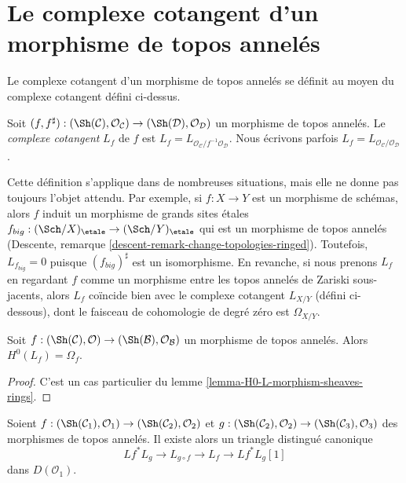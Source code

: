 \section{Le complexe cotangent d'un morphisme de topos annelés}
\label{section-cotangent-morphism-ringed-topoi}

\noindent
Le complexe cotangent d'un morphisme de topos annelés se définit au moyen du
complexe cotangent défini ci-dessus.

\begin{definition}
\label{definition-cotangent-complex-morphism-ringed-topoi}
Soit $(f, f^\sharp) : (\Sh(\mathcal{C}), \mathcal{O}_\mathcal{C}) \to
(\Sh(\mathcal{D}), \mathcal{O}_\mathcal{D})$ un morphisme de topos annelés.
Le {\it complexe cotangent} $L_f$ de $f$ est
$L_f = L_{\mathcal{O}_\mathcal{C}/f^{-1}\mathcal{O}_\mathcal{D}}$.
Nous écrivons parfois
$L_f = L_{\mathcal{O}_\mathcal{C}/\mathcal{O}_\mathcal{D}}$.
\end{definition}

\noindent
Cette définition s'applique dans de nombreuses situations, mais elle ne donne
pas toujours l'objet attendu. Par exemple, si $f : X \to Y$ est un morphisme
de schémas, alors $f$ induit un morphisme de grands sites étales
$f_{big} : (\Sch/X)_\etale \to (\Sch/Y)_\etale$
qui est un morphisme de topos annelés (Descente, remarque
\ref{descent-remark-change-topologies-ringed}). Toutefois,
$L_{f_{big}} = 0$ puisque $(f_{big})^\sharp$ est un isomorphisme. En revanche,
si nous prenons $L_f$ en regardant $f$ comme un morphisme entre les topos
annelés de Zariski sous-jacents, alors $L_f$ coïncide bien avec le complexe
cotangent $L_{X/Y}$ (défini ci-dessous), dont le faisceau de cohomologie de
degré zéro est $\Omega_{X/Y}$.

\begin{lemma}
\label{lemma-H0-L-morphism-ringed-topoi}
Soit $f : (\Sh(\mathcal{C}), \mathcal{O}) \to
(\Sh(\mathcal{B}), \mathcal{O}_\mathcal{B})$ un morphisme de topos annelés.
Alors $H^0(L_f) = \Omega_f$.
\end{lemma}

\begin{proof}
C'est un cas particulier du lemme \ref{lemma-H0-L-morphism-sheaves-rings}.
\end{proof}

\begin{lemma}
\label{lemma-triangle-ringed-topoi}
Soient $f : (\Sh(\mathcal{C}_1), \mathcal{O}_1) \to
(\Sh(\mathcal{C}_2), \mathcal{O}_2)$ et
$g : (\Sh(\mathcal{C}_2), \mathcal{O}_2) \to
(\Sh(\mathcal{C}_3), \mathcal{O}_3)$ des morphismes de topos annelés. Il
existe alors un triangle distingué canonique
$$
Lf^* L_g \to L_{g \circ f} \to L_f \to Lf^*L_g[1]
$$
dans $D(\mathcal{O}_1)$.
\end{lemma}

